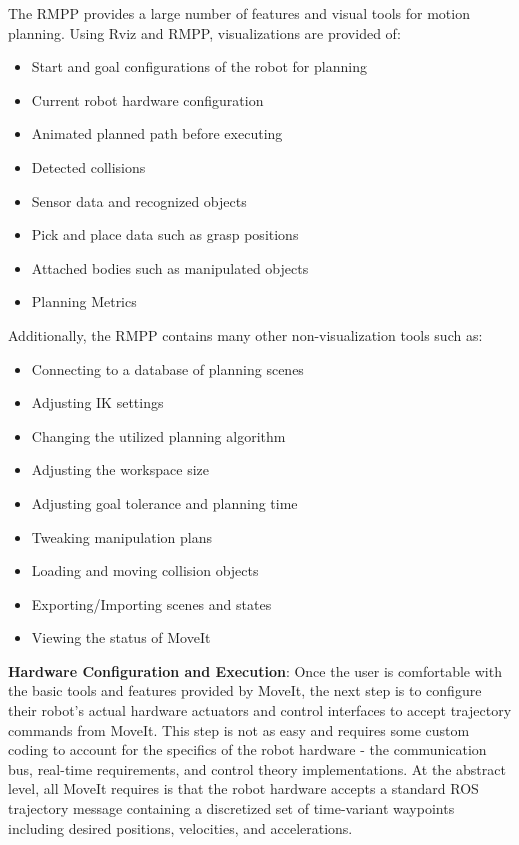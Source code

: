 \documentclass[10pt,journal,compsoc]{joser1}
\begin{document}
{The RMPP provides a large number of features and visual tools for motion planning. Using Rviz and RMPP, visualizations are provided of:
\begin{itemize}
    \item Start and goal configurations of the robot for planning
    \item Current robot hardware configuration
    \item Animated planned path before executing
    \item Detected collisions
    \item Sensor data and recognized objects
    \item Pick and place data such as grasp positions
    \item Attached bodies such as manipulated objects
    \item Planning Metrics
\end{itemize}

Additionally, the RMPP contains many other non-visualization tools such as:
\begin{itemize}
    \item Connecting to a database of planning scenes
    \item Adjusting IK settings
    \item Changing the utilized planning algorithm
    \item Adjusting the workspace size
    \item Adjusting goal tolerance and planning time
    \item Tweaking manipulation plans
    \item Loading and moving collision objects
    \item Exporting/Importing scenes and states
    \item Viewing the status of MoveIt
\end{itemize}

{\bf Hardware Configuration and Execution}: Once the user is comfortable with the basic tools and features provided by MoveIt, the next step is to configure their robot's actual hardware actuators and control interfaces to accept trajectory commands from MoveIt. This step is not as easy and requires some custom coding to account for the specifics of the robot hardware - the communication bus, real-time requirements, and control theory implementations. At the abstract level, all MoveIt requires is that the robot hardware accepts a standard ROS trajectory message containing a discretized set of time-variant waypoints including desired positions, velocities, and accelerations.  

}
\end{document}
